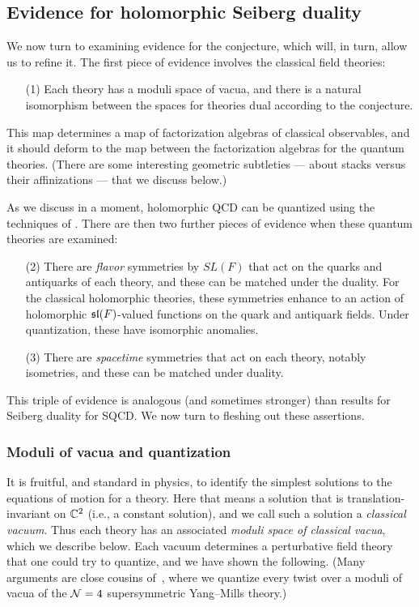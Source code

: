 \documentclass[11pt]{amsart}
\begin{document}
\subsection{Evidence for holomorphic Seiberg duality}

We now turn to examining evidence for the conjecture, which will, in turn, allow us to refine it.
The first piece of evidence involves the classical field theories:
\begin{enumerate}
\item[(1)] Each theory has a moduli space of vacua, and there is a natural isomorphism between the spaces for theories dual according to the conjecture.
\end{enumerate}
This map determines a map of factorization algebras of classical observables,
and it should deform to the map between the factorization algebras for the quantum theories.
(There are some interesting geometric subtleties --- about stacks versus their affinizations --- that we discuss below.)

As we discuss in a moment, holomorphic QCD can be quantized using the techniques of \cite{Whol}.
There are then two further pieces of evidence when these quantum theories are examined:
\begin{enumerate}
\item[(2)] There are {\em flavor} symmetries by $SL(F)$ that act on the quarks and antiquarks of each theory, 
and these can be matched under the duality. 
For the classical holomorphic theories, these symmetries enhance to an action of holomorphic $\sl(F)$-valued functions on the quark and antiquark fields.
Under quantization, these have isomorphic anomalies.
\item[(3)] There are {\em spacetime} symmetries that act on each theory, notably isometries, and these can be matched under duality.
\end{enumerate}
This triple of evidence is analogous (and sometimes stronger) than results for Seiberg duality for SQCD. 
We now turn to fleshing out these assertions.

\subsubsection{Moduli of vacua and quantization}

It is fruitful, and standard in physics, to identify the simplest solutions to the equations of motion for a theory.
Here that means a solution that is translation-invariant on $\CC^2$ (i.e., a constant solution),
and we call such a solution a {\em classical vacuum}.
Thus each theory has an associated {\em moduli space of classical vacua},
which we describe below.
Each vacuum determines a perturbative field theory that one could try to quantize,
and we have shown the following.
(Many arguments are close cousins of~\cite{EGW}, where we quantize every twist over a moduli of vacua of the $\cN=4$ supersymmetric Yang--Mills theory.)
\end{document}
